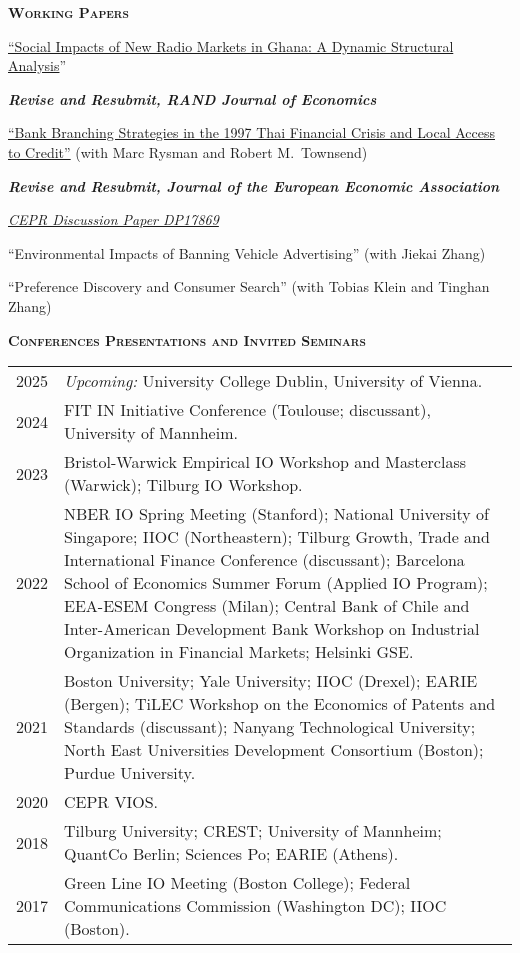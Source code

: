 \documentclass[11pt,overlapped,line,letterpaper]{article}
\newcommand{\cvsec}[1]{\vspace{\baselineskip}\textbf{\textsc{#1}}}
\newenvironment{list1}{
  \begin{list}{\ding{113}}{%
      \setlength{\itemsep}{0in}\setlength{\itemindent}{-1.5em}
      \setlength{\parsep}{0in}\setlength{\parskip}{0in}
      \setlength{\topsep}{0in}\setlength{\partopsep}{0in}
      \setlength{\leftmargin}{0.5in}}}{\end{list}}
\begin{document}
\cvsec{Working Papers}
\begin{list1}
\item[] \href{https://walshc.github.io/research/ghana_radio.pdf}{``Social Impacts of New Radio Markets in Ghana: A Dynamic Structural Analysis}''
  \par \textsl{\textbf{Revise and Resubmit, RAND Journal of Economics}}
  \item[] \href{https://walshc.github.io/research/thai_banks.pdf}{``Bank Branching Strategies in the 1997 Thai Financial Crisis and Local Access to Credit''} (with Marc Rysman and Robert M.~Townsend)
  \par \textsl{\textbf{Revise and Resubmit, Journal of the European Economic Association}}
    \par \href{https://cepr.org/publications/dp17869-0}{\textsl{CEPR Discussion Paper DP17869}}
  \item[] ``Environmental Impacts of Banning Vehicle Advertising'' (with Jiekai Zhang)
  \item[] ``Preference Discovery and Consumer Search'' (with Tobias Klein and Tinghan Zhang)
\end{list1}

\newpage
\cvsec{Conferences Presentations and Invited Seminars} \smallskip\\
\begin{tabularx}{\textwidth}{lX}
  2025 & \emph{Upcoming:} University College Dublin, University of Vienna. \\
  2024 & FIT IN Initiative Conference (Toulouse; discussant), University of Mannheim. \\
  2023 & Bristol-Warwick Empirical IO Workshop and Masterclass (Warwick);
         Tilburg IO Workshop. \\
  2022 & NBER IO Spring Meeting (Stanford);
         National University of Singapore;
         IIOC (Northeastern);
         Tilburg Growth, Trade and International Finance Conference (discussant);
         Barcelona School of Economics Summer Forum (Applied IO Program);
         EEA-ESEM Congress (Milan);
         Central Bank of Chile and Inter-American Development Bank Workshop on Industrial Organization in Financial Markets; Helsinki GSE. \\
  2021 & Boston University;
         Yale University;
         IIOC (Drexel);
         EARIE (Bergen);
         TiLEC Workshop on the Economics of Patents and Standards (discussant);
         Nanyang Technological University;
         North East Universities Development Consortium (Boston);
         Purdue University. \\
         2020 & CEPR VIOS. \\
  2018 & Tilburg University;
         CREST;
         University of Mannheim;
         QuantCo Berlin;
         Sciences Po;
         EARIE (Athens). \\
  2017 & Green Line IO Meeting (Boston College);
         Federal Communications Commission (Washington DC);
         IIOC (Boston). \\
\end{tabularx}
\end{document}
